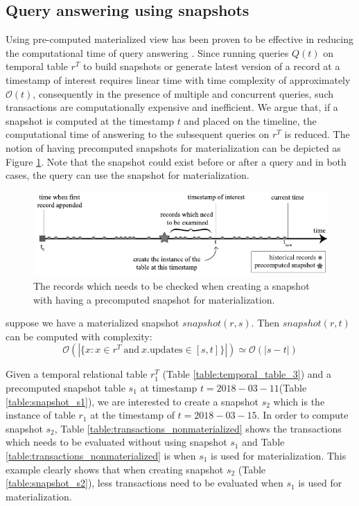 \subsection{Query answering using snapshots} 
Using pre-computed materialized view has been proven to be effective in reducing the computational time of query answering \cite{sohrabi2016materialized} \cite{du2017deepsea}. Since running queries $Q(t)$ on temporal table $r^T$ to build snapshots or generate latest version of a record at a timestamp of interest requires linear time with time complexity of approximately $\mathcal{O}(t)$, consequently in the presence of multiple and concurrent queries, such transactions are computationally expensive and inefficient. We argue that, if a snapshot is computed at the timestamp $t$ and placed on the timeline, the computational time of answering to the subsequent queries on $r^T$ is reduced. The notion of having precomputed snapshots for materialization can be depicted as Figure \ref{fig:snapshot_materialization}. Note that the snapshot could exist before or after a query and in both cases, the query can use the snapshot for materialization.

\begin{figure}[t]
	\centering
	\includegraphics[width=\textwidth]{figs/snapshot_materialization.pdf}
	\caption{The records which needs to be checked when creating a snapshot with having a precomputed snapshot for materialization.}
	\label{fig:snapshot_materialization}
\end{figure}

\begin{prop}
	suppose we have a materialized snapshot $snapshot(r,s)$. Then $snapshot(r,t)$ can be computed with complexity:
	$$\mathcal{O}(|\{x: x\in r^T\mathrm{\ and\ } x.\mathrm{updates} \in [s,t]\}|) \simeq \mathcal{O}(|s-t|)$$
\label{prop:materialized_snapshot_complexity}
\end{prop}

\begin{example}
	Given a temporal relational table $r_1^T$ (Table \ref{table:temporal_table_3}) and a precomputed snapshot table $s_1$ at timestamp $t = 2018-03-11$(Table \ref{table:snapshot_s1}), we are interested to create a snapshot $s_2$ which is the instance of table $r_1$ at the timestamp of $t = 2018-03-15$. In order to compute snapshot $s_2$, Table \ref{table:transactions_nonmaterialized} shows the transactions which needs to be evaluated without using snapshot $s_1$ and Table \ref{table:transactions_nonmaterialized} is when $s_1$ is used for materialization. This example clearly shows that when creating snapshot $s_2$ (Table \ref{table:snapshot_s2}), less transactions need to be evaluated when $s_1$ is used for materialization.
\label{example:materialized_snapshot_complexity}
\end{example}


